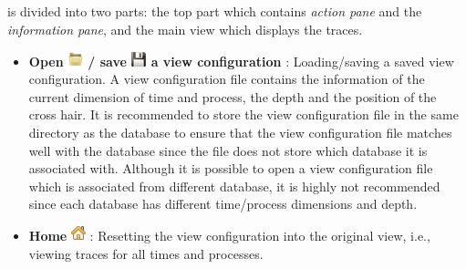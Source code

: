 
\subsection{\traceview}
\label{sec:traceview}

\traceview{} is divided into two parts: the top part which contains \emph{action pane} and the \emph{information pane}, and the main view which displays the traces. 

\begin{itemize}

\item \textbf{Open \includegraphics[scale=.7]{fig/hpctraceviewer-button-open.png} / save \includegraphics[scale=.5]{fig/hpctraceviewer-button-save.png} a view configuration} : Loading/saving a saved view configuration. 
A view configuration file contains the information of the current dimension of time and process, the depth and the position of the cross hair. 
It is recommended to store the view configuration file in the same directory as the database to ensure that the view configuration file matches well with the database since the file does not store which database it is associated with. 
Although it is possible to open a view configuration file which is associated from different database, it is highly not recommended since each database has different time/process dimensions and depth.
\item \textbf{Home} \includegraphics[scale=.5]{fig/hpctraceviewer-button-home-screen.png} : Resetting the view configuration into the original view, i.e., viewing traces for all times and processes.


\end{itemize}
